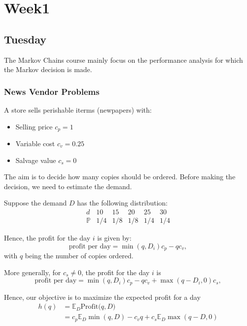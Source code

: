 
\chapter{Week1}

\section{Tuesday}

The Markov Chains course mainly focus on the performance analysis for which the Markov decision is made.

\subsection{News Vendor Problems}

A store sells perishable iterms (newpapers) with:
\begin{itemize}
\item
Selling price $c_p=1$
\item
Variable cost $c_v = 0.25$
\item
Salvage value $c_s=0$
\end{itemize}

The aim is to decide how many copies should be ordered. Before making the decision, we need to estimate the demand.

Suppose the demand $D$ has the following distribution:
\[
\begin{array}{llllll}
d&10&15&20&25&30
\\
\mathbb{P}&1/4&1/8&1/8&1/4&1/4
\end{array}
\]

Hence, the profit for the day $i$ is given by:
\[
\mbox{profit per day} = \min(q,D_i)c_p - qc_v,
\]
with $q$ being the number of copies ordered.

More generally, for $c_s\ne 0$, the profit for the day $i$ is
\[
\mbox{profit per day} = \min(q,D_i)c_p - qc_v+\max(q-D_i,0)c_s,
\]

Hence, our objective is to maximize the expected profit for a day
\begin{equation}
\begin{aligned}
h(q)&=\mathbb{E}_D\mbox{Profit($q,D$)}\\
&=c_p\mathbb{E}_D\min(q,D) - c_vq+c_s\mathbb{E}_D\max(q-D,0)
\end{aligned}
\end{equation}











